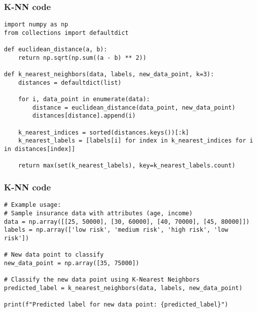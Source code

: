 \begin{frame}[fragile]\frametitle{K-NN code}
{\tiny
\begin{lstlisting}
import numpy as np
from collections import defaultdict

def euclidean_distance(a, b):
    return np.sqrt(np.sum((a - b) ** 2))

def k_nearest_neighbors(data, labels, new_data_point, k=3):
    distances = defaultdict(list)

    for i, data_point in enumerate(data):
        distance = euclidean_distance(data_point, new_data_point)
        distances[distance].append(i)

    k_nearest_indices = sorted(distances.keys())[:k]
    k_nearest_labels = [labels[i] for index in k_nearest_indices for i in distances[index]]

    return max(set(k_nearest_labels), key=k_nearest_labels.count)
\end{lstlisting}
}
\end{frame}



\begin{frame}[fragile]\frametitle{K-NN code}
{\tiny
\begin{lstlisting}
# Example usage:
# Sample insurance data with attributes (age, income)
data = np.array([[25, 50000], [30, 60000], [40, 70000], [45, 80000]])
labels = np.array(['low risk', 'medium risk', 'high risk', 'low risk'])

# New data point to classify
new_data_point = np.array([35, 75000])

# Classify the new data point using K-Nearest Neighbors
predicted_label = k_nearest_neighbors(data, labels, new_data_point)

print(f"Predicted label for new data point: {predicted_label}")

\end{lstlisting}
}
\end{frame}

